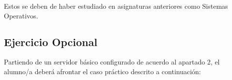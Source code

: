 
Estos se deben de haber estudiado en asignaturas anteriores como Sistemas Operativos.

\subsection{Ejercicio Opcional}

Partiendo de un servidor básico configurado de acuerdo al apartado 2, el alumno/a deberá
afrontar el caso práctico descrito a continuación:

